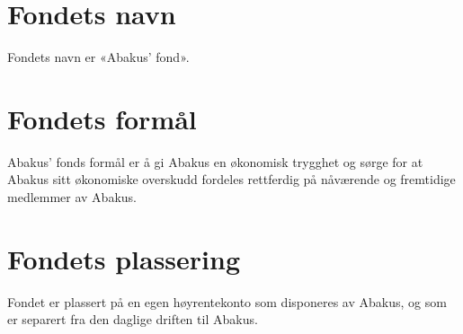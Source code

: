 \section{Fondets navn}
Fondets navn er «Abakus’ fond».

\section{Fondets formål}
Abakus’ fonds formål er å gi Abakus en økonomisk trygghet og sørge for at Abakus sitt 
økonomiske overskudd fordeles rettferdig på nåværende og fremtidige medlemmer av 
Abakus.
\section{Fondets plassering}
Fondet er plassert på en egen høyrentekonto som disponeres av Abakus, og som er separert 
fra den daglige driften til Abakus.
